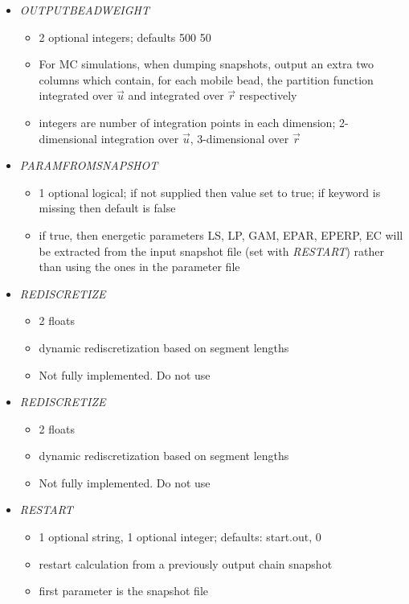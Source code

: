 \documentclass[12pt]{article}
\begin{document}
\begin{itemize}
\begin{itemize}
  \end{itemize}
%
\item {\it OUTPUTBEADWEIGHT}
  \begin{itemize}
    \item 2 optional integers; defaults 500 50
    \item For MC simulations, when dumping snapshots, output an extra two columns which contain, for each mobile bead, the partition function integrated over $\vec{u}$ and integrated over $\vec{r}$ respectively
    \item integers are number of integration points in each dimension; 2-dimensional integration over $\vec{u}$, 3-dimensional over $\vec{r}$
  \end{itemize}
%
\item {\it PARAMFROMSNAPSHOT}
  \begin{itemize}
    \item 1 optional logical; if not supplied then value set to true; if keyword is missing then default is false
    \item if true, then energetic parameters LS, LP, GAM, EPAR, EPERP, EC will be extracted from the input snapshot file (set with {\em RESTART}) rather than using the ones in the parameter file
  \end{itemize}
%
\item {\it REDISCRETIZE}
  \begin{itemize}
    \item 2 floats
    \item dynamic rediscretization based on segment lengths
    \item {\color{red} Not fully implemented. Do not use}
  \end{itemize}
%
\item {\it REDISCRETIZE}
  \begin{itemize}
    \item 2 floats
    \item dynamic rediscretization based on segment lengths
    \item {\color{red} Not fully implemented. Do not use}
  \end{itemize}
%
\item {\it RESTART}
  \begin{itemize}
    \item 1 optional string, 1 optional integer; defaults: start.out, 0
    \item restart calculation from a previously output chain snapshot
    \item first parameter is the snapshot file

\end{itemize}
\end{itemize}
\end{document}
